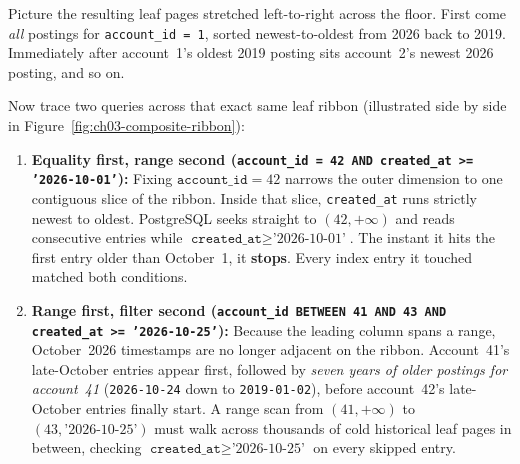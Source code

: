 Picture the resulting leaf pages stretched left-to-right across the floor. First come \emph{all} postings for \texttt{account\_id = 1}, sorted newest-to-oldest from 2026 back to 2019. Immediately after account~1's oldest 2019 posting sits account~2's newest 2026 posting, and so on.

Now trace two queries across that exact same leaf ribbon (illustrated side by side in Figure~\ref{fig:ch03-composite-ribbon}):

\begin{enumerate}
  \item \textbf{Equality first, range second (\texttt{account\_id = 42 AND created\_at >= '2026-10-01'}):}
  Fixing $\texttt{account\_id} = 42$ narrows the outer dimension to one contiguous slice of the ribbon. Inside that slice, \texttt{created\_at} runs strictly newest to oldest. PostgreSQL seeks straight to $(42, +\infty)$ and reads consecutive entries while $\texttt{created\_at} \ge \text{'2026-10-01'}$. The instant it hits the first entry older than October~1, it \textbf{stops}. Every index entry it touched matched both conditions.
  \item \textbf{Range first, filter second (\texttt{account\_id BETWEEN 41 AND 43 AND created\_at >= '2026-10-25'}):}
  Because the leading column spans a range, October~2026 timestamps are no longer adjacent on the ribbon. Account~41's late-October entries appear first, followed by \emph{seven years of older postings for account~41} (\texttt{2026-10-24} down to \texttt{2019-01-02}), before account~42's late-October entries finally start. A range scan from $(41, +\infty)$ to $(43, \text{'2026-10-25'})$ must walk across thousands of cold historical leaf pages in between, checking $\texttt{created\_at} \ge \text{'2026-10-25'}$ on every skipped entry.
\end{enumerate}

